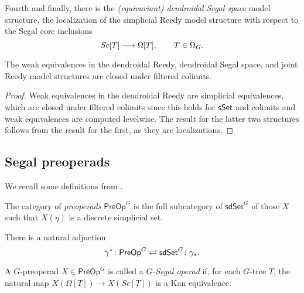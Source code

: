\documentclass[a4paper,10pt
,draft
]{article}%
\renewcommand{\1}{\eta}%
\begin{document}
Fourth and finally, there is the \textit{(equivariant) dendroidal Segal space} model structure,
the localization of the simplicial Reedy model structure with respect to the Segal core inclusions
\[
      Sc[T] \longrightarrow \Omega[T],
      \qquad
      T \in \Omega_G.
\]

\begin{lemma}
      \label{FCOLIM_WE_LEM}
      The weak equivalences in the dendroidal Reedy, dendroidal Segal space, and joint Reedy model structures are closed under filtered colimits.
\end{lemma}
\begin{proof}
      Weak equivalences in the dendroidal Reedy are simplicial equivalences, which are closed under filtered colimits
      since this holds for $\mathsf{sSet}$ and colimits and weak equivalences are computed levelwise.
      The result for the latter two structures follows from the result for the first, as they are localizations.
\end{proof}



\subsection{Segal preoperads}
\label{SPREOP_SEC}

We recall some definitions from \cite[\S4,5]{BP_edss}.

\begin{definition}
      The category of \textit{preoperads} $\mathsf{PreOp}^G$ is the full subcategory of $\mathsf{sdSet}^G$ of those $X$ such that
      $X(\eta)$ is a discrete simplicial set.

      There is a natural adjuction
      \[
            \gamma^{\**} \colon \mathsf{PreOp}^G \rightleftarrows \mathsf{sdSet}^G \colon \gamma_{\**}.
      \]
\end{definition}


\begin{definition}
	A $G$-preoperad $X \in \mathsf{PreOp}^G$ is called a \textit{$G$-Segal operad} if, 
	for each $G$-tree $T$,
	the natural map 
	$X\left( \Omega[T] \right) \to 
	X \left( Sc[T] \right)$
	is a Kan equivalence.
\end{definition}
\end{document}
